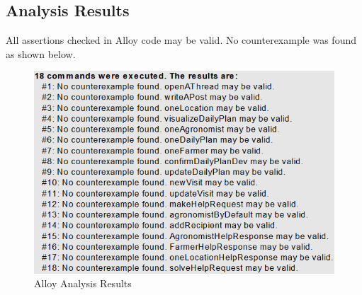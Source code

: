 \subsection{Analysis Results}

All assertions checked in Alloy code may be valid. No counterexample was found as shown below.

\begin{figure}[H]
  \includegraphics[width=\textwidth,height=\textheight,keepaspectratio]{./Images/Alloy/assertionsExecution.png}
           \vspace*{-0.5cm}
  \caption{Alloy Analysis Results}
\end{figure}